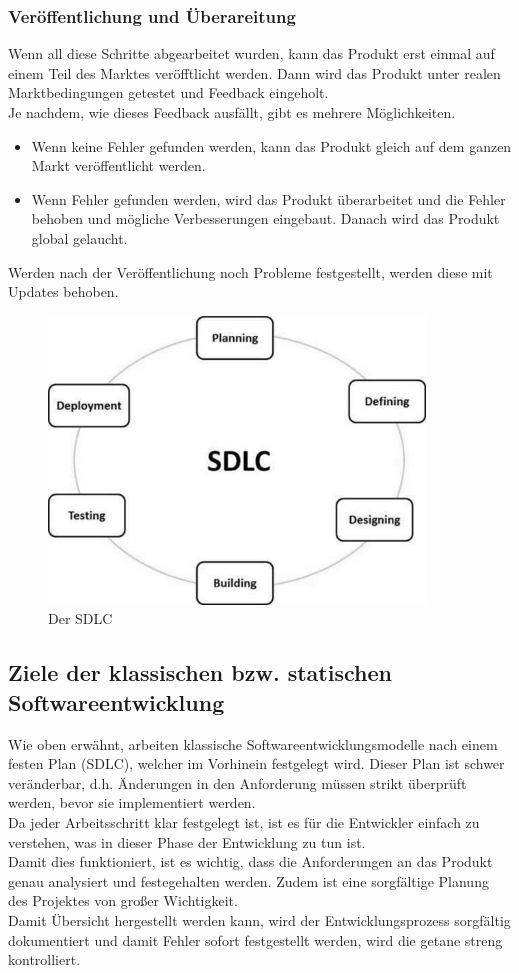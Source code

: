 \documentclass[a4paper, 10pt]{scrartcl}
\begin{document}
\subsubsection{Veröffentlichung und Überareitung}
Wenn all diese Schritte abgearbeitet wurden, kann das Produkt erst einmal auf einem Teil des Marktes veröfftlicht werden. Dann wird das Produkt unter realen Marktbedingungen getestet und Feedback eingeholt.\\
Je nachdem, wie dieses Feedback ausfällt, gibt es mehrere Möglichkeiten. 
\begin{itemize}
\item Wenn keine Fehler gefunden werden, kann das Produkt gleich auf dem ganzen Markt veröffentlicht werden.
\item Wenn Fehler gefunden werden, wird das Produkt überarbeitet und die Fehler behoben und mögliche Verbesserungen eingebaut. Danach wird das Produkt global gelaucht.
\end{itemize}
Werden nach der Veröffentlichung noch Probleme festgestellt, werden diese mit Updates behoben. \citep{stoica}

\begin{figure}
\begin{center}
\includegraphics[width=10cm]{sdlc.jpg}
\caption{Der SDLC}
\end{center}
\end{figure}

\subsection{Ziele der klassischen bzw. statischen Softwareentwicklung}
Wie oben erwähnt, arbeiten klassische Softwareentwicklungsmodelle nach einem festen Plan (SDLC), welcher im Vorhinein festgelegt wird. Dieser Plan ist schwer veränderbar, d.h. Änderungen in den Anforderung müssen strikt überprüft werden, bevor sie implementiert werden.\\
Da jeder Arbeitsschritt klar festgelegt ist, ist es für die Entwickler einfach zu verstehen, was in dieser Phase der Entwicklung zu tun ist.\\
Damit dies funktioniert, ist es wichtig, dass die Anforderungen an das Produkt genau analysiert und festegehalten werden. Zudem ist eine sorgfältige Planung des Projektes von großer Wichtigkeit.\\
Damit Übersicht hergestellt werden kann, wird der Entwicklungsprozess sorgfältig dokumentiert und damit Fehler sofort festgestellt werden, wird die getane streng kontrolliert. \citep{stoica}
\end{document}
